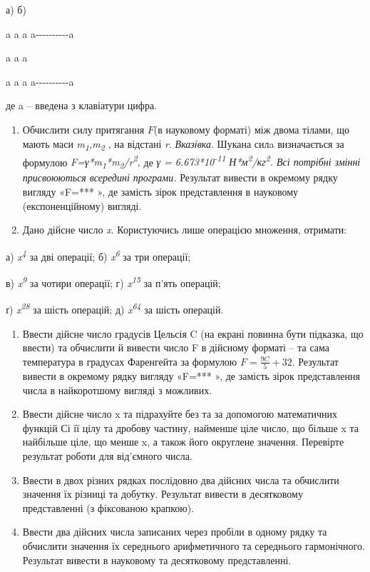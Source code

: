\documentclass[]{article}
\begin{document}
а) б)

a a a a-\/-\/-\/-\/-\/-\/-\/-\/-\/-a

a a \textbar{} a \textbar{}

a a a a-\/-\/-\/-\/-\/-\/-\/-\/-\/-a

де a -- введена з клавіатури цифра.

\begin{enumerate}
\def\labelenumi{\arabic{enumi}.}
\item
  Обчислити силу притягання \(F\)(в науковому форматі) між двома тілами,
  що мають маси \emph{m\textsubscript{1},m\textsubscript{2}} \emph{,} на
  відстані \emph{r}. \emph{\emph{Вказівка}}. Шукана силa визначається за
  формулою
  \emph{F=γ*m\textsubscript{1}*m\textsubscript{2}/r\textsuperscript{2},}
  де \emph{γ = 6.673*10\textsuperscript{-11}
  Н*м\textsuperscript{2}/кг\textsuperscript{2}. Всі потрібні змінні
  присвоюються всередині програми.} Результат вивести в окремому рядку
  вигляду «F=*** », де замість зірок представлення в науковому
  (експоненційному) вигляді.
\item
  Дано дійсне число \emph{x}. Користуючись лише операцією множення,
  отримати:
\end{enumerate}

а) \emph{x\textsuperscript{4}} за дві операції; б)
\emph{x\textsuperscript{6}} за три операції;

в) \emph{x\textsuperscript{9}} за чотири операції; г)
\emph{x\textsuperscript{15}} за п'ять операцій;

ґ) \emph{x\textsuperscript{28}} за шість операцій; д)
\emph{x\textsuperscript{64}} за шість операцій.

\begin{enumerate}
\def\labelenumi{\arabic{enumi}.}
\item
  Ввести дійсне число градусів Цельсія C (на екрані повинна бути
  підказка, що ввести) та обчислити й вивести число F в дійсному форматі
  -- та сама температура в градусах Фаренгейта за формулою
  \(F = \frac{9C}{5} + 32\). Результат вивести в окремому рядку вигляду
  «F=*** », де замість зірок представлення числа в найкоротшому вигляді
  з можливих.
\item
  Ввести дійсне число x та підрахуйте без та за допомогою математичних
  функцій Сі її цілу та дробову частину, найменше ціле число, що більше
  x та найбільше ціле, що менше x, а також його округлене значення.
  Перевірте результат роботи для від'ємного числа.
\item
  Ввести в двох різних рядках послідовно два дійсних числа та обчислити
  значення їх різниці та добутку. Результат вивести в десятковому
  представленні (з фіксованою крапкою).
\item
  Ввести два дійсних числа записаних через пробіли в одному рядку та
  обчислити значення їх середнього арифметичного та середнього
  гармонічного. Результат вивести в науковому та десятковому
  представленні.
\end{enumerate}
\end{document}
